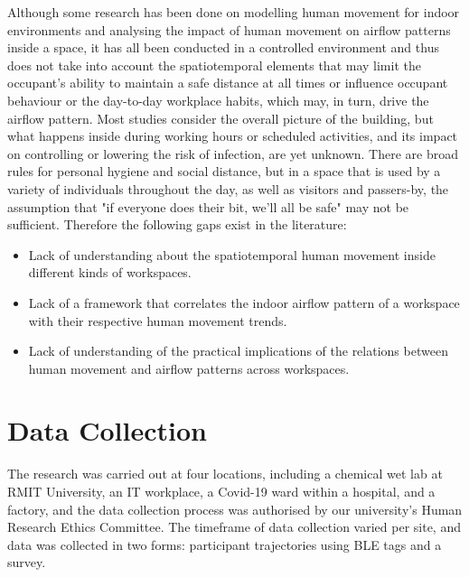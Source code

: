 \documentclass[acmtog]{acmart}
\begin{document}
Although some research has been done on modelling human movement for indoor environments and analysing the impact of human movement on airflow patterns inside a space, it has all been conducted in a controlled environment and thus does not take into account the spatiotemporal elements that may limit the occupant's ability to maintain a safe distance at all times or influence occupant behaviour or the day-to-day workplace habits, which may, in turn, drive the airflow pattern. Most studies consider the overall picture of the building, but what happens inside during working hours or scheduled activities, and its impact on controlling or lowering the risk of infection, are yet unknown. There are broad rules for personal hygiene and social distance, but in a space that is used by a variety of individuals throughout the day, as well as visitors and passers-by, the assumption that "if everyone does their bit, we'll all be safe" may not be sufficient.
Therefore the following gaps exist in the literature:
\begin{itemize}
    \item Lack of understanding about the spatiotemporal human movement inside different kinds of workspaces.
    \item Lack of a framework that correlates the indoor airflow pattern of a workspace with their respective human movement trends.
    \item Lack of understanding of the practical implications of the relations between human movement and airflow patterns across workspaces.
\end{itemize}




\section{Data Collection}
The research was carried out at four locations, including a chemical wet lab at RMIT University, an IT workplace, a Covid-19 ward within a hospital, and a factory, and the data collection process was authorised by our university's Human Research Ethics Committee. The timeframe of data collection varied per site, and data was collected in two forms: participant trajectories using BLE tags and a survey.
\end{document}
